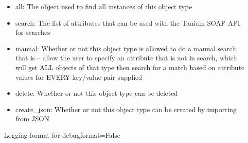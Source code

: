 \documentclass[letterpaper,10pt,english]{sphinxmanual}
\begin{document}
\begin{fulllineitems}
\begin{description}
\begin{itemize}
\item {} 
all: The  object used to find all instances of this object type

\item {} 
search: The list of attributes that can be used with the Tanium SOAP API for searches

\item {} 
manual: Whether or not this object type is allowed to do a manual search, that is -- allow the user to specify an attribute that is not in search, which will get ALL objects of that type then search for a match based on attribute values for EVERY key/value pair supplied

\item {} 
delete: Whether or not this object type can be deleted

\item {} 
create\_json: Whether or not this object type can be created by importing from JSON

\end{itemize}

\end{description}

\end{fulllineitems}


\begin{fulllineitems}
\label{pytan.constants:pytan.constants.INFO_FORMAT}
Logging format for debugformat=False

\end{fulllineitems}

\end{document}
